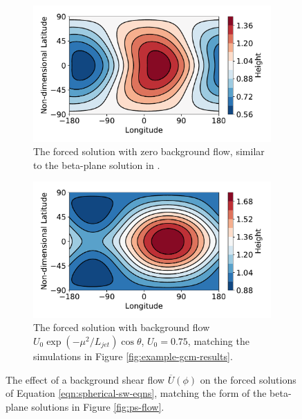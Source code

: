 \begin{figure}
  \centering
  \begin{subfigure}[t]{0.48\textwidth}
    \includegraphics[width=\textwidth]{figures/wave-mean-flow/new-sphere-non-shifted.pdf}
    \caption{The forced solution with zero background flow, similar to the beta-plane solution in \citet{matsuno1966quasi} .}
    \label{fig:non-shifted-sphere}
  \end{subfigure}
\quad
  \begin{subfigure}[t]{0.48\textwidth}
    \includegraphics[width=\textwidth]{figures/wave-mean-flow/new-sphere-shifted.pdf}
    \caption{The forced solution with background flow $U_{0} \exp(-\mu^{2}/L_{jet}) \cos \theta$, $U_{0}=0.75$, matching the simulations in Figure \ref{fig:example-gcm-results}.}
    \label{fig:shifted-sphere}
  \end{subfigure}
  \caption{The effect of a background shear flow $\overline{U}(\phi)$ on the forced solutions of Equation \ref{eqn:spherical-sw-eqns}, matching the form of the beta-plane solutions in Figure \ref{fig:ps-flow}.}
  \label{fig:spherical-solutions}
\end{figure}


